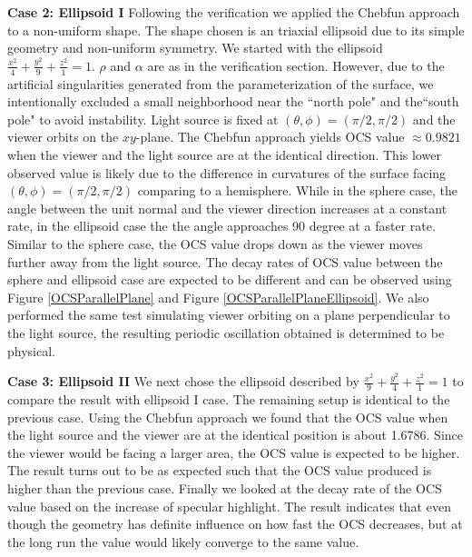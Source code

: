 \documentclass[11pt]{amsart}
\theoremstyle{definition}
\begin{document}
{\bf Case 2: Ellipsoid I} Following the verification we applied the Chebfun approach to a non-uniform shape. The shape chosen is an triaxial ellipsoid due to its simple geometry and non-uniform symmetry. We started with the ellipsoid $\frac{x^2}{4}+\frac{y^2}{9}+\frac{z^2}{1} = 1$. $\rho$ and $\alpha$ are as in the verification section. However, due to the artificial singularities generated from the parameterization of the surface, we intentionally excluded a small neighborhood near the ``north pole" and the``south pole" to avoid instability. Light source is fixed at $(\theta,\phi) = (\pi/2, \pi/2)$ and the viewer orbits on the $xy$-plane. The Chebfun approach yields OCS value $\approx 0.9821$ when the viewer and the light source are at the identical direction. This lower observed value is likely due to the difference in curvatures of the surface facing $(\theta, \phi)=(\pi/2, \pi/2)$ comparing to a hemisphere. While in the sphere case, the angle between the unit normal and the viewer direction increases at a constant rate, in the ellipsoid case the the angle approaches 90 degree at a faster rate. Similar to the sphere case, the OCS value drops down as the viewer moves further away from the light source. The decay rates of OCS value between the sphere and ellipsoid case are expected to be different and can be observed using Figure \ref{OCSParallelPlane} and Figure \ref{OCSParallelPlaneEllipsoid}. We also performed the same test simulating viewer orbiting on a plane perpendicular to the light source, the resulting periodic oscillation obtained is determined to be physical.

{\bf Case 3: Ellipsoid II} We next chose the ellipsoid described by $\frac{x^2}{9}+\frac{y^2}{4}+\frac{z^2}{1} = 1$ to compare the result with ellipsoid I case. The remaining setup is identical to the previous case. Using the Chebfun approach we found that the OCS value when the light source and the viewer are at the identical position is about 1.6786. Since the viewer would be facing a larger area, the OCS value is expected to be higher. The result turns out to be as expected such that the OCS value produced is higher than the previous case. Finally we looked at the decay rate of the OCS value based on the increase of specular highlight. The result indicates that even though the geometry has definite influence on how fast the OCS decreases, but at the long run the value would likely converge to the same value.
\end{document}
